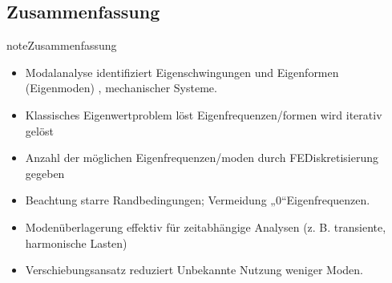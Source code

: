 \documentclass[letterpaper,10pt,german]{jupyterBook}
\begin{document}
\subsection{Zusammenfassung}
\label{\detokenize{chapters/chapter6/Modalanalyse:zusammenfassung}}
\begin{sphinxadmonition}{note}{Zusammenfassung}
\begin{itemize}
\item {} 
\sphinxAtStartPar
Modalanalyse identifiziert Eigenschwingungen und Eigenformen (Eigenmoden) , mechanischer Systeme.

\item {} 
\sphinxAtStartPar
Klassisches Eigenwertproblem löst Eigenfrequenzen/\sphinxhyphen{}formen \sphinxhyphen{} wird iterativ gelöst

\item {} 
\sphinxAtStartPar
Anzahl der möglichen Eigenfrequenzen/\sphinxhyphen{}moden durch FE\sphinxhyphen{}Diskretisierung gegeben

\item {} 
\sphinxAtStartPar
Beachtung starre Randbedingungen; Vermeidung „0“\sphinxhyphen{}Eigenfrequenzen.

\item {} 
\sphinxAtStartPar
Modenüberlagerung effektiv für zeitabhängige Analysen (z. B. transiente, harmonische Lasten)

\item {} 
\sphinxAtStartPar
Verschiebungsansatz reduziert Unbekannte \sphinxhyphen{} Nutzung weniger Moden.

\end{itemize}
\end{sphinxadmonition}

\sphinxstepscope
\end{document}
